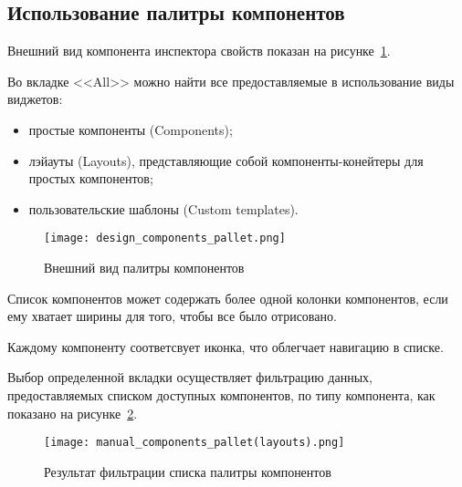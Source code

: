 \subsection{Использование палитры компонентов}
\label{sec:manual:pallet_manual}

Внешний вид компонента инспектора свойств показан на рисунке~\ref{sec:manual:components_pallet}.

Во вкладке <<All>> можно найти все предоставляемые в использование виды виджетов:
\begin{itemize}
  \item простые компоненты (Components);
  \item лэйауты (Layouts), представляющие собой компоненты-конейтеры для простых компонентов;
  \item пользовательские шаблоны (Custom templates).
\end{itemize}

\begin{figure}[ht]
  \centering
    \texttt{[image: design\_components\_pallet.png]}
    \caption{Внешний вид палитры компонентов}
    \label{sec:manual:components_pallet}
\end{figure}

Список компонентов может содержать более одной колонки компонентов, если ему хватает ширины для того, чтобы все было отрисовано.

Каждому компоненту соответсвует иконка, что облегчает навигацию в списке.\pagebreak

Выбор определенной вкладки осуществляет фильтрацию данных, предоставляемых списком доступных компонентов, по типу компонента, как показано на рисунке~\ref{sec:manual:components_pallet_layouts}.

\begin{figure}[ht]
  \centering
    \texttt{[image: manual\_components\_pallet(layouts).png]}
    \caption{Результат фильтрации списка палитры компонентов}
    \label{sec:manual:components_pallet_layouts}
\end{figure}

